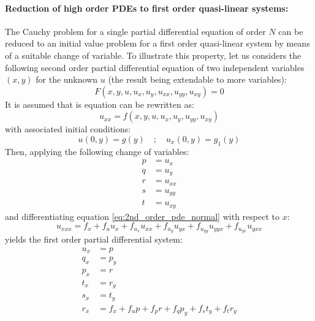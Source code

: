 \paragraph{Reduction of high order PDEs to first order quasi-linear systems:} The Cauchy problem for a single partial differential equation of order $N$ can be reduced to an initial value problem for a first order quasi-linear system by means of a suitable change of variable. To illustrate this property, let us considers the following second order partial differential equation of two independent variables $(x,y)$ for the unknown $u$ (the result being extendable to more variables):
\begin{equation}
  \label{eq:2nd_order_pde}
  F(x,y,u,u_x,u_y,u_{xx},u_{yy},u_{xy})=0
\end{equation}
It is assumed that is equation can be rewritten as:
\begin{equation}
  \label{eq:2nd_order_pde_normal}
  u_{xx}= f(x,y,u,u_x,u_y,u_{yy},u_{xy})
\end{equation}
with associated initial conditions:
\begin{equation}
  \label{eq:2nd_order_pde_ICs}
  u(0,y)= g(y) \quad ; \quad u_x(0,y)= g_1(y)
\end{equation}
Then, applying the following change of variables:
\begin{equation*}
  \label{eq:change_of_variables}
  \begin{aligned}
     p &= u_x\\
     q &= u_{y} \\
     r &= u_{xx} \\
     s &= u_{yy}\\
     t &= u_{xy}
  \end{aligned}
\end{equation*}
and differentiating equation \eqref{eq:2nd_order_pde_normal} with respect to $x$:
\begin{equation*}
  \label{eq:r_x}
  u_{xxx}= f_x + f_u u_x + f_{u_x}u_{xx} + f_{u_y}u_{yx} + f_{u_{yy}}u_{yyx}+f_{u_{yx}}u_{yxx}
\end{equation*}
yields the first order partial differential system:
\begin{equation}
  \label{eq:1st_order_quasilinear_system}
  \begin{aligned}
    u_x & = p \\
    q_x & = p_y \\
    p_x & = r \\
    t_x & = r_y \\
    s_x & = t_y \\
    r_x & = f_x + f_up + f_p r + f_q p_y + f_s t_y + f_t r_y
  \end{aligned}
\end{equation}
